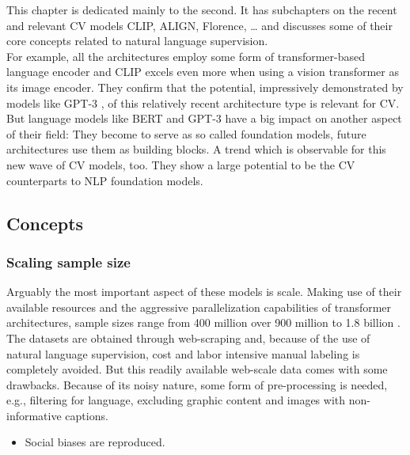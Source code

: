 \documentclass[
]{krantz}
\providecommand{\tightlist}{%
  \setlength{\itemsep}{0pt}\setlength{\parskip}{0pt}}
\begin{document}
This chapter is dedicated mainly to the second.
It has subchapters on the recent and relevant CV models CLIP, ALIGN, Florence, \ldots{} and discusses some of their core concepts related to natural language supervision. \\
For example, all the architectures employ some form of transformer-based language encoder \citep{vaswani2017attention} and CLIP excels even more when using a vision transformer as its image encoder.
They confirm that the potential, impressively demonstrated by models like GPT-3 \citep{brown2020language}, of this relatively recent architecture type is relevant for CV.\\
But language models like BERT and GPT-3 have a big impact on another aspect of their field:
They become to serve as so called foundation models, future architectures use them as building blocks.
A trend which is observable for this new wave of CV models, too.
They show a large potential to be the CV counterparts to NLP foundation models.

\hypertarget{concepts}{%
\subsection{Concepts}\label{concepts}}

\hypertarget{scaling-sample-size}{%
\subsubsection{Scaling sample size}\label{scaling-sample-size}}

Arguably the most important aspect of these models is scale.
Making use of their available resources and the aggressive parallelization capabilities of transformer architectures, sample sizes range from 400 million \citep[CLIP;][]{radford2021learning} over 900 million \citep[Florence;][]{yuan2021florence} to 1.8 billion \citep[ALIGN;][]{jia2021scaling}.
The datasets are obtained through web-scraping and, because of the use of natural language supervision, cost and labor intensive manual labeling is completely avoided.
But this readily available web-scale data comes with some drawbacks.
Because of its noisy nature, some form of pre-processing is needed, e.g., filtering for language, excluding graphic content and images with non-informative captions.

\begin{itemize}
\tightlist
\item
  Social biases are reproduced.
\end{itemize}
\end{document}
